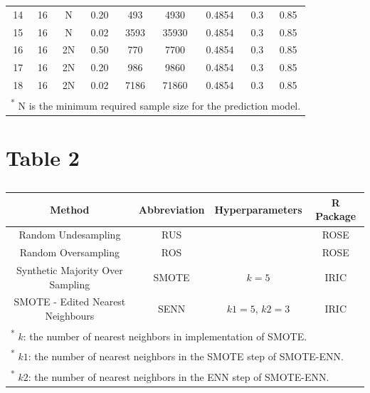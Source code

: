 \documentclass[
]{article}
\begin{document}
\begin{table}[!h]
\begin{tabular}[t]{ccccccccc}
14 & 16 & N & 0.20 & 493 & 4930 & 0.4854 & 0.3 & 0.85\\
  
15 & 16 & N & 0.02 & 3593 & 35930 & 0.4854 & 0.3 & 0.85\\
  
16 & 16 & 2N & 0.50 & 770 & 7700 & 0.4854 & 0.3 & 0.85\\
  
17 & 16 & 2N & 0.20 & 986 & 9860 & 0.4854 & 0.3 & 0.85\\
  
18 & 16 & 2N & 0.02 & 7186 & 71860 & 0.4854 & 0.3 & 0.85\\
\bottomrule
\multicolumn{9}{l}{\rule{0pt}{1em}\textsuperscript{*} N is the minimum required sample size for the prediction model.}\\
\end{tabular}
\end{table}

\newpage

\hypertarget{table-2}{%
\section{Table 2}\label{table-2}}

\begin{table}[!h]

\caption{\label{tab:tab:table} }
\centering
\begin{tabular}[t]{cccc}
\toprule
Method & Abbreviation & Hyperparameters & R Package\\
\midrule
Random Undesampling & RUS &  & ROSE \cite{rose}\\
\addlinespace
Random Oversampling & ROS &  & ROSE \cite{rose}\\
\addlinespace
Synthetic Majority Over Sampling & SMOTE & $k=5$ & IRIC \cite{iric}\\
\addlinespace
SMOTE - Edited Nearest Neighbours & SENN & $k1=5$, $k2 = 3$ & IRIC \cite{iric}\\
\bottomrule
\multicolumn{4}{l}{\rule{0pt}{1em}\textsuperscript{*}      $k$: the number of nearest neighbors in implementation of SMOTE.}\\
\multicolumn{4}{l}{\rule{0pt}{1em}\textsuperscript{*}     $k1$: the number of nearest neighbors in the SMOTE step of SMOTE-ENN.}\\
\multicolumn{4}{l}{\rule{0pt}{1em}\textsuperscript{*}     $k2$: the number of nearest neighbors in the ENN step of SMOTE-ENN.}\\
\end{tabular}
\end{table}
\end{document}
